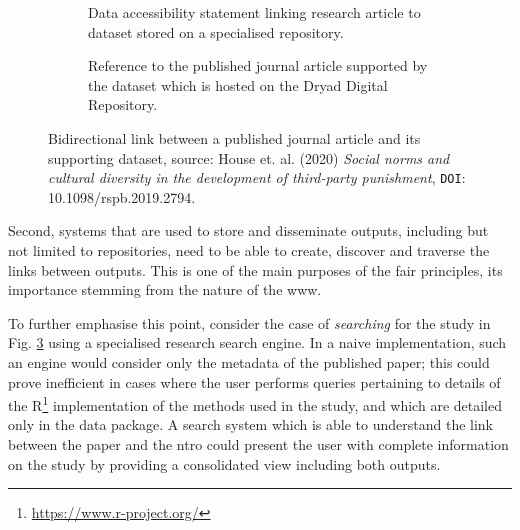 \begin{figure}[ht!]
\centering
\begin{subfigure}{0.9\textwidth}
  \caption{Data accessibility statement linking research article to dataset stored on a specialised repository.}
  \label{subfig:paper2data}
\end{subfigure}
\begin{subfigure}{0.9\textwidth}
  \caption{Reference to the published journal article supported by the dataset which is hosted on the Dryad Digital Repository.}
  \label{subfig:data2paper}
\end{subfigure}
\caption{Bidirectional link between a published journal article and its supporting dataset, source: House et. al. (2020) \emph{Social norms and cultural diversity in the development of third-party punishment}, \texttt{DOI}: 10.1098/rspb.2019.2794.}
\label{fig:link}
\end{figure}

Second, systems that are used to store and disseminate outputs, including but not limited to repositories, need to be able to create, discover and traverse the links between outputs. This is one of the main purposes of the \gls{fair} principles, its importance stemming from the nature of the \gls{www}.

To further emphasise this point, consider the case of \emph{searching} for the study in Fig. \ref{fig:link} using a specialised research search engine. In a naive implementation, such an engine would consider only the metadata of the published paper; this could prove inefficient in cases where the user performs queries pertaining to details of the R\footnote{\url{https://www.r-project.org/}} implementation of the methods used in the study, and which are detailed only in the data package. A search system which is able to understand the link between the paper and the \gls{ntro} could present the user with complete information on the study by providing a consolidated view including both outputs.

